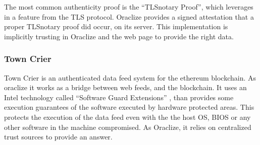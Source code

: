 The most common authenticity proof is the ``TLSnotary Proof'', which leverages
  in a feature from the TLS protocol.
Oraclize provides a signed attestation that a proper TLSnotary proof did occur,
  on its server.
This implementation is implicitly trusting in Oraclize and the web page to
  provide the right data.

\subsubsection{Town Crier}
Town Crier \cite{zhang2016town} is an authenticated data feed system for
  the ethereum blockchain.
As oraclize it works as a bridge between web feeds, and the blockchain.
It uses an Intel technology called ``Software Guard Extensions''
  \cite{costan2016intel}, than provides some execution guarantees of the software
  executed by hardware protected areas.
This protects the execution of the data feed even with the the host OS, BIOS or
  any other software in the machine compromised.
As Oraclize, it relies on centralized trust sources to provide an answer.
